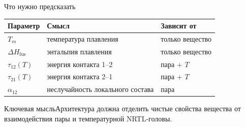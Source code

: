 \documentclass[aspectratio=169,10pt]{beamer}
\newcommand{\keybox}[1]{\begin{block}{Ключевая мысль}#1\end{block}}
\begin{document}
\begin{frame}{Что нужно предсказать}
  \small
  \begin{tabularx}{\textwidth}{lYY}
    \toprule
    \textbf{Параметр} & \textbf{Смысл} & \textbf{Зависит от}\\
    \midrule
    $T_m$ & температура плавления & только вещество\\
    $\Delta H_{\mathrm{fus}}$ & энтальпия плавления & только вещество\\
    $\tau_{12}(T)$ & энергия контакта 1–2 & пара + $T$\\
    $\tau_{21}(T)$ & энергия контакта 2–1 & пара + $T$\\
    $\alpha_{12}$ & неслучайность локального состава & пара\\
    \bottomrule
  \end{tabularx}
  \vspace{0.4em}
  \keybox{Архитектура должна отделить чистые свойства вещества от взаимодействия пары и температурной NRTL-головы.}
\end{frame}
\end{document}
